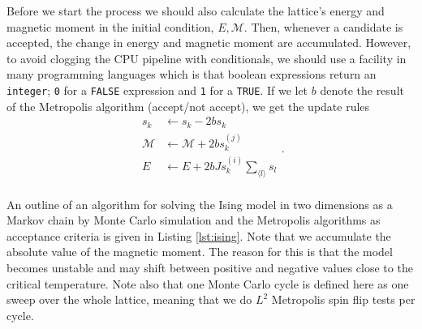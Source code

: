 \documentclass[]{article}
\begin{document}
Before we start the process we should also calculate the lattice's energy and magnetic moment in the initial condition, $E, \mathcal{M}$. Then, whenever a candidate is accepted, the change in energy and magnetic moment are accumulated. However, to avoid clogging the CPU pipeline with conditionals, we should use a facility in many programming languages which is that boolean expressions return an \lstinline|integer|; \lstinline|0| for a \lstinline|FALSE| expression and \lstinline|1| for a \lstinline|TRUE|. If we let $b$ denote the result of the Metropolis algorithm (accept/not accept), we get the update rules
\begin{equation}
\begin{aligned}
	s_k &\leftarrow s_k - 2bs_k \\
	\mathcal{M} &\leftarrow \mathcal{M} + 2bs_k^{(j)} \\
	E &\leftarrow E + 2bJ s_k^{(i)} \sum_{\langle l \rangle} s_l \\
\end{aligned}.
\end{equation}

An outline of an algorithm for solving the Ising model in two dimensions as a Markov chain by Monte Carlo simulation and the Metropolis algorithms as acceptance criteria is given in Listing \ref{lst:ising}. Note that we accumulate the absolute value of the magnetic moment. The reason for this is that the model becomes unstable and may shift between positive and negative values close to the critical temperature. Note also that one Monte Carlo cycle is defined here as one sweep over the whole lattice, meaning that we do $L^2$ Metropolis spin flip tests per cycle.
\end{document}
